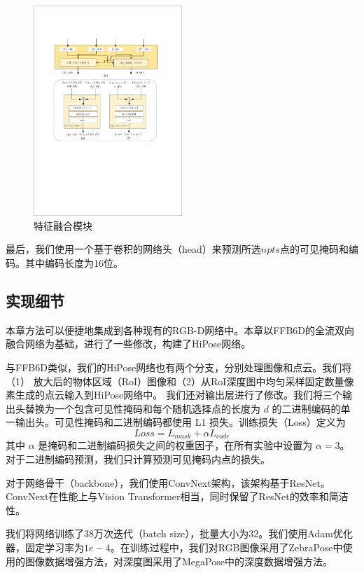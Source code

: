 \begin{figure}[htbp]
    \centering
    \includegraphics[width=0.5\textwidth]{figure/hipose/fuse.pdf}
    \caption{特征融合模块}
    \label{fig:fuse}
\end{figure}


最后，我们使用一个基于卷积的网络头（head）来预测所选$npts$点的可见掩码和编码。其中编码长度为16位。

\subsection{实现细节}\label{subsection:implementation_details}
本章方法可以便捷地集成到各种现有的RGB-D网络中。本章以FFB6D\cite{he2021ffb6d}的全流双向融合网络为基础，进行了一些修改，构建了HiPose网络。

与FFB6D类似，我们的HiPose网络也有两个分支，分别处理图像和点云。我们将（1） 放大后的物体区域（RoI）图像和（2）从RoI深度图中均匀采样固定数量像素生成的点云输入到HiPose网络中。
我们还对输出层进行了修改。我们将三个输出头替换为一个包含可见性掩码和每个随机选择点的长度为 $d$ 的二进制编码的单一输出头。可见性掩码和二进制编码都使用 L1 损失。训练损失（Loss）定义为
\begin{equation}
Loss = L_{mask} + \alpha L_{code}   
\end{equation}
其中 $\alpha$ 是掩码和二进制编码损失之间的权重因子，在所有实验中设置为 $\alpha = 3$。对于二进制编码预测，我们只计算预测可见掩码内点的损失。

对于网络骨干（backbone），我们使用ConvNext\cite{Liu2022ACF}架构，该架构基于ResNet\cite{He2015DeepRL}。ConvNext在性能上与Vision Transformer\cite{Dosovitskiy2020AnII}相当，同时保留了ResNet的效率和简洁性。

我们将网络训练了$38$万次迭代（batch size），批量大小为$32$。我们使用Adam\cite{Kingma2014AdamAM}优化器，固定学习率为$1e-4$。在训练过程中，我们对RGB图像采用了ZebraPose\cite{su2022zebrapose}中使用的图像数据增强方法，对深度图采用了MegaPose\cite{Labbe2022MegaPose6P}中的深度数据增强方法。
